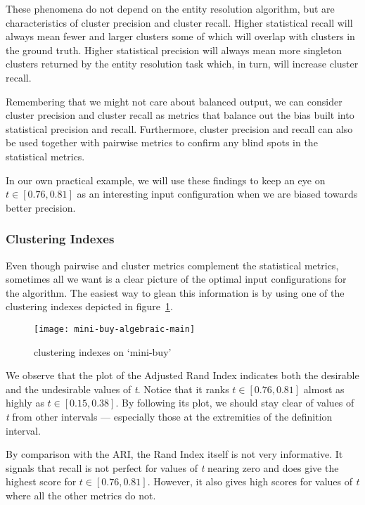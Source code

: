 These phenomena do not depend on the entity resolution algorithm, but are
characteristics of cluster precision and cluster recall.
Higher statistical recall will always mean fewer and larger clusters some of
which will overlap with clusters in the ground truth.
Higher statistical precision will always mean more singleton clusters returned
by the entity resolution task which, in turn, will increase cluster recall.

Remembering that we might not care about balanced output, we can consider
cluster precision and cluster recall as metrics that balance out the bias built
into statistical precision and recall.
Furthermore, cluster precision and recall can also be used together with
pairwise metrics to confirm any blind spots in the statistical metrics.

In our own practical example, we will use these findings to keep an eye on
$t\in\left[0.76,0.81\right]$ as an interesting input configuration when we are
biased towards better precision.

\subsubsection{Clustering Indexes}

Even though pairwise and cluster metrics complement the statistical metrics,
sometimes all we want is a clear picture of the optimal input configurations for
the algorithm.
The easiest way to glean this information is by using one of the clustering
indexes depicted in figure~\ref{fig:mini-alg}.

\begin{figure}[!h]
    \centering
    \captionsetup{justification=centering}
    \texttt{[image: mini-buy-algebraic-main]}
    \caption{clustering indexes on `mini-buy'}
    \label{fig:mini-alg}
\end{figure}

We observe that the plot of the Adjusted Rand Index indicates both the desirable
and the undesirable values of \textit{t}.
Notice that it ranks $t\in\left[0.76,0.81\right]$ almost as highly as
$t\in\left[0.15,0.38\right]$.
By following its plot, we should stay clear of values of \textit{t} from other
intervals --- especially those at the extremities of the definition interval.

By comparison with the ARI, the Rand Index itself is not very informative.
It signals that recall is not perfect for values of \textit{t} nearing zero and
does give the highest score for $t\in\left[0.76,0.81\right]$.
However, it also gives high scores for values of \textit{t} where all the other
metrics do not.

